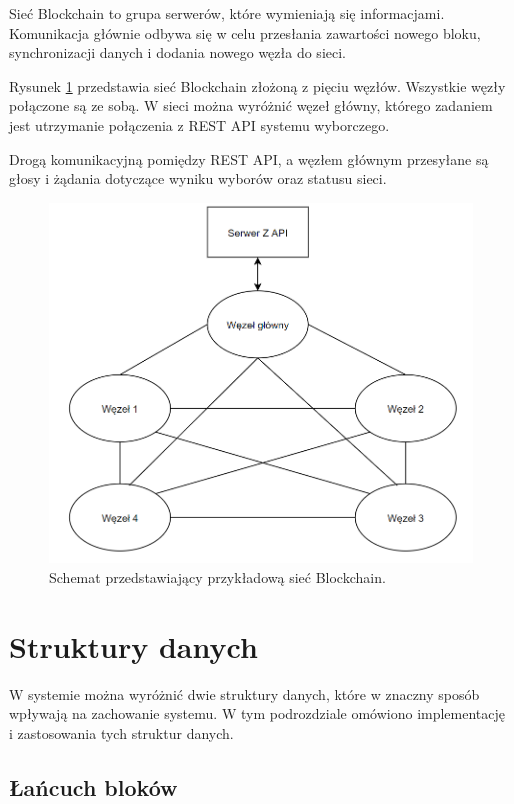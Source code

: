 \documentclass[a4paper,12pt]{book}
\begin{document}
Sieć Blockchain to grupa serwerów, które wymieniają się informacjami. Komunikacja głównie odbywa się w celu przesłania zawartości nowego bloku, synchronizacji danych i dodania nowego węzła do sieci.

Rysunek \ref{blockchainarch} przedstawia sieć Blockchain złożoną z pięciu węzłów. Wszystkie węzły połączone są ze sobą. W sieci można wyróżnić węzeł główny, którego zadaniem jest utrzymanie połączenia z REST API systemu wyborczego.

Drogą komunikacyjną pomiędzy REST API, a węzłem głównym przesyłane są głosy i żądania dotyczące wyniku wyborów oraz statusu sieci.

\begin{figure}[h]
  \centering
\includegraphics[width=\textwidth]{images/blockchainarch.png}
\caption{Schemat przedstawiający przykładową sieć Blockchain.}\label{blockchainarch}
\end {figure}

\newpage

\section{Struktury danych}
 
W systemie można wyróżnić dwie struktury danych, które w znaczny sposób wpływają na zachowanie systemu. W tym podrozdziale omówiono implementację i zastosowania tych struktur danych.
 
\subsection{Łańcuch bloków}
 
\end{document}
